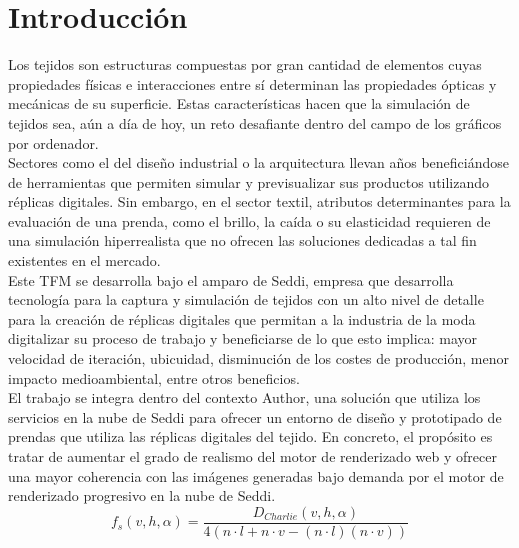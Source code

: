 \chapter{Introducci\'on}
Los tejidos son estructuras compuestas por gran cantidad de elementos cuyas propiedades f\'isicas e interacciones entre s\'i
determinan las propiedades \'opticas y mec\'anicas de su superficie. Estas caracter\'isticas hacen que la simulaci\'on de tejidos
sea, a\'un a d\'ia de hoy, un reto desafiante dentro del campo de los gr\'aficos por ordenador.\\

Sectores como el del dise\~no industrial o la arquitectura llevan a\~nos benefici\'andose de herramientas que permiten
simular y previsualizar sus productos utilizando r\'eplicas digitales. Sin embargo, en el sector textil, atributos determinantes
para la evaluaci\'on de una prenda, como el brillo, la ca\'ida o su elasticidad requieren de una simulaci\'on hiperrealista
que no ofrecen las soluciones dedicadas a tal fin existentes en el mercado.\\

Este TFM se desarrolla bajo el amparo de Seddi, empresa que desarrolla tecnolog\'ia para la captura y simulaci\'on de tejidos
con un alto nivel de detalle para la creaci\'on de r\'eplicas digitales que permitan a la industria de la moda
digitalizar su proceso de trabajo y beneficiarse de lo que esto implica: mayor velocidad de iteraci\'on, ubicuidad, disminuci\'on de
los costes de producci\'on, menor impacto medioambiental, entre otros beneficios.\\

El trabajo se integra dentro del contexto Author, una soluci\'on que utiliza los servicios en la nube de Seddi para ofrecer
un entorno de dise\~no y prototipado de prendas que utiliza las r\'eplicas digitales del tejido. En concreto, el prop\'osito
es tratar de aumentar el grado de realismo del motor de renderizado web y ofrecer una mayor coherencia
con las im\'agenes generadas bajo demanda por el motor de renderizado progresivo en la nube de Seddi.\\

$$
f_s(v, h, \alpha) = \frac{D_{Charlie}(v, h, \alpha)}{4(n\cdot{l} + n\cdot{v} - (n\cdot{l})  (n\cdot{v})  )}
$$




